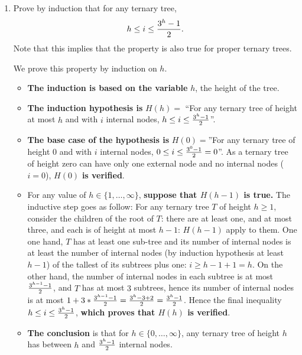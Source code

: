 \begin{enumerate}

\item Prove by induction that for any ternary tree, 
%
$$h\leq i \leq {3^h-1\over 2}.$$ 
%
Note that this implies that the property is also true for proper
ternary trees.
\begin{solution}

We prove this property by induction on $h$.
\begin{itemize}

\item {\bf The induction is based on the variable} $h$, the height of
the tree.

\item {\bf The induction hypothesis is} $H(h)=$ ``For any
ternary tree of height at most $h$ and with $i$ internal nodes,
%
$h\leq i \leq {3^h-1\over2}$''.

\item {\bf The base case of the hypothesis is} $H(0)=$''For any
ternary tree of height $0$ and with $i$ internal nodes,
$0\leq{i}\leq {3^0-1\over2}=0$''.
%
As a ternary tree of height zero can have only one external node and
no internal nodes ($i=0$), $H(0)$ {\bf is verified}.

\item For any value of $h\in\{1,\ldots,\infty\}$, {\bf suppose that
$H(h-1)$ is true.}  The inductive step goes as follow:
%
For any ternary tree $T$ of height $h\geq1$, consider the children of
the root of $T$: there are at least one, and at most three, and each
is of height at most $h-1$: $H(h-1)$ apply to them.
%
One one hand, $T$ has at least one sub-tree and its number of internal
nodes is at least the number of internal nodes (by induction
hypothesis at least $h-1$) of the tallest of its subtrees plus one:
$i\geq h-1+1=h$.
%
On the other hand, the number of internal nodes in each subtree is at
most ${3^{h-1}-1\over 2}$, and $T$ has at most $3$ subtrees, hence its
number of internal nodes is at most 
$1+3*{3^{h-1}-1\over 2}
= {3^h-3+2\over2} 
= {3^h-1\over2}$.
%
Hence the final inequality $h\leq i \leq {3^{h}-1\over 2}$, {\bf which
proves that $H(h)$ is verified}.

\item {\bf The conclusion} is that for $h\in\{0,\ldots,\infty\}$, any
ternary tree of height $h$ has between $h$ and ${3^h-1}\over2$ internal nodes.


\end{itemize}
\end{solution}
\end{enumerate}
